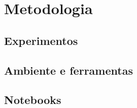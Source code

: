\chapter{Metodologia}
\label{cap:desenvolvimentos}

\section{Experimentos}

\section{Ambiente e ferramentas}

\section{Notebooks}


